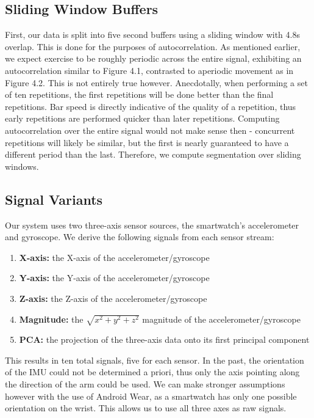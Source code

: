 \subsection{Sliding Window Buffers}
First, our data is split into five second buffers using a sliding window with 4.8s overlap. This is done for the purposes of autocorrelation. As mentioned earlier, we expect exercise to be roughly periodic across the entire signal, exhibiting an autocorrelation similar to Figure 4.1, contrasted to aperiodic movement as in Figure 4.2. This is not entirely true however. Anecdotally, when performing a set of ten repetitions, the first repetitions will be done better than the final repetitions. Bar speed is directly indicative of the quality of a repetition, thus early repetitions are performed quicker than later repetitions. Computing autocorrelation over the entire signal would not make sense then - concurrent repetitions will likely be similar, but the first is nearly guaranteed to have a different period than the last. Therefore, we compute segmentation over sliding windows. 

\subsection{Signal Variants}
Our system uses two three-axis sensor sources, the smartwatch's accelerometer and gyroscope. We derive the following signals from each sensor stream:

\begin{enumerate}
    \item \textbf{X-axis:} the X-axis of the accelerometer/gyroscope
    \item \textbf{Y-axis:} the Y-axis of the accelerometer/gyroscope
    \item \textbf{Z-axis:} the Z-axis of the accelerometer/gyroscope
    \item \textbf{Magnitude:} the $\sqrt{x^2 + y^2 + z^2}$ magnitude of the accelerometer/gyroscope
    \item \textbf{PCA:} the projection of the three-axis data onto its first principal component
\end{enumerate}

This results in ten total signals, five for each sensor. In the past, the orientation of the IMU could not be determined a priori, thus only the axis pointing along the direction of the arm could be used. We can make stronger assumptions however with the use of Android Wear, as a smartwatch has only one possible orientation on the wrist. This allows us to use all three axes as raw signals.

